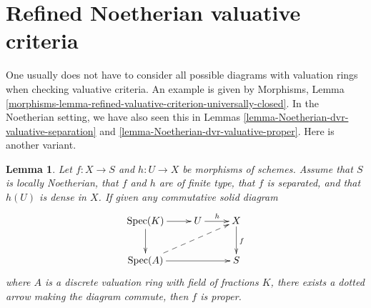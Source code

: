 \documentclass{stacks-project}
\theoremstyle{plain}
\newtheorem{lemma}[subsection]{Lemma}
\theoremstyle{definition}
\theoremstyle{remark}
\numberwithin{equation}{subsection}
\def\Spec{\mathop{\mathrm{Spec}}}
\begin{document}
\section{Refined Noetherian valuative criteria}
\label{section-refined-valuative-criteria}

\noindent
One usually does not have to consider all possible diagrams with
valuation rings when checking valuative criteria. An example is
given by Morphisms, Lemma
\ref{morphisms-lemma-refined-valuative-criterion-universally-closed}.
In the Noetherian setting, we have also seen this in
Lemmas \ref{lemma-Noetherian-dvr-valuative-separation} and
\ref{lemma-Noetherian-dvr-valuative-proper}. Here is another variant.

\begin{lemma}
\label{lemma-refined-valuative-criterion-proper}
Let $f : X \to S$ and $h : U \to X$ be morphisms of schemes.
Assume that $S$ is locally Noetherian, that $f$ and $h$ are of finite type,
that $f$ is separated, and that $h(U)$ is dense in $X$.
If given any commutative solid diagram
$$
\xymatrix{
\Spec(K) \ar[r] \ar[d] & U \ar[r]^h & X \ar[d]^f \\
\Spec(A) \ar[rr] \ar@{-->}[rru] & & S
}
$$
where $A$ is a discrete valuation ring with field of fractions $K$, there
exists a dotted arrow making the diagram commute, then $f$ is proper.
\end{lemma}
\end{document}
